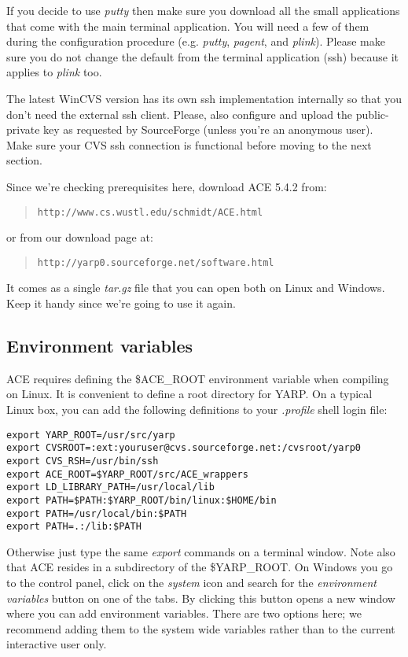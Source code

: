 If you decide to use {\em putty} then make sure you download all the small applications that come with the main terminal application. You will need a few of them during the configuration procedure (e.g. {\em putty}, {\em pagent}, and {\em plink}). Please make sure you do not change the default from the terminal application (ssh) because it applies to {\em plink} too.

The latest WinCVS version has its own ssh implementation internally so that you don't need the external ssh client. Please, also configure and upload the public-private key as requested by SourceForge (unless you're an anonymous user). Make sure your CVS ssh connection is functional before moving to the next section. 

Since we're checking prerequisites here, download ACE 5.4.2 from:

\begin{quote}
{\tt http://www.cs.wustl.edu/schmidt/ACE.html}
\end{quote}

or from our download page at:
\begin{quote}
{\tt http://yarp0.sourceforge.net/software.html}
\end{quote}

It comes as a single {\em tar.gz} file that you can open both on Linux and Windows. Keep it handy since we're going to use it again.

\subsection{Environment variables}
ACE requires defining the \$ACE\_ROOT environment variable when compiling on Linux. It is convenient to define a root directory for YARP. On a typical Linux box, you can add the following definitions to your {\em .profile} shell login file:

\begin{verbatim}
export YARP_ROOT=/usr/src/yarp
export CVSROOT=:ext:youruser@cvs.sourceforge.net:/cvsroot/yarp0
export CVS_RSH=/usr/bin/ssh
export ACE_ROOT=$YARP_ROOT/src/ACE_wrappers
export LD_LIBRARY_PATH=/usr/local/lib
export PATH=$PATH:$YARP_ROOT/bin/linux:$HOME/bin
export PATH=/usr/local/bin:$PATH
export PATH=.:/lib:$PATH
\end{verbatim}

Otherwise just type the same {\em export} commands on a terminal window. Note also that ACE resides in a subdirectory of the \$YARP\_ROOT. On Windows you go to the control panel, click on the {\em system} icon and search for the {\em environment variables} button on one of the tabs. By clicking this button opens a new window where you can add environment variables. There are two options here; we recommend adding them to the system wide variables rather than to the current interactive user only. 


